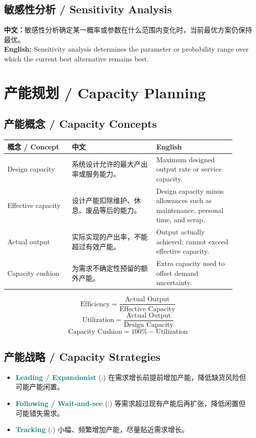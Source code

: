 \documentclass[11pt,a4paper]{ctexart}
\newcommand{\term}[2]{\textbf{\textcolor{Teal}{#1}} \textcolor{Muted}{(#2)}}
\newcommand{\cn}[1]{\textbf{中文：}#1}
\newcommand{\en}[1]{\textbf{English:} #1}
\begin{document}
\subsection{敏感性分析 / Sensitivity Analysis}
\cn{敏感性分析确定某一概率或参数在什么范围内变化时，当前最优方案仍保持最优。}\\
\en{Sensitivity analysis determines the parameter or probability range over which the current best alternative remains best.}

\section{产能规划 / Capacity Planning}

\subsection{产能概念 / Capacity Concepts}
\begin{longtable}{L{0.26\linewidth}L{0.34\linewidth}L{0.32\linewidth}}
\toprule
\textbf{概念 / Concept} & \textbf{中文} & \textbf{English} \\
\midrule
Design capacity & 系统设计允许的最大产出率或服务能力。 & Maximum designed output rate or service capacity. \\
Effective capacity & 设计产能扣除维护、休息、废品等后的能力。 & Design capacity minus allowances such as maintenance, personal time, and scrap. \\
Actual output & 实际实现的产出率，不能超过有效产能。 & Output actually achieved; cannot exceed effective capacity. \\
Capacity cushion & 为需求不确定性预留的额外产能。 & Extra capacity used to offset demand uncertainty. \\
\bottomrule
\end{longtable}

\[
\text{Efficiency}=\frac{\text{Actual Output}}{\text{Effective Capacity}}
\]
\[
\text{Utilization}=\frac{\text{Actual Output}}{\text{Design Capacity}}
\]
\[
\text{Capacity Cushion}=100\%-\text{Utilization}
\]

\subsection{产能战略 / Capacity Strategies}
\begin{itemize}
  \item \term{Leading / Expansionist}: 在需求增长前提前增加产能，降低缺货风险但可能产能闲置。
  \item \term{Following / Wait-and-see}: 等需求超过现有产能后再扩张，降低闲置但可能错失需求。
  \item \term{Tracking}: 小幅、频繁增加产能，尽量贴近需求增长。
\end{itemize}
\end{document}
